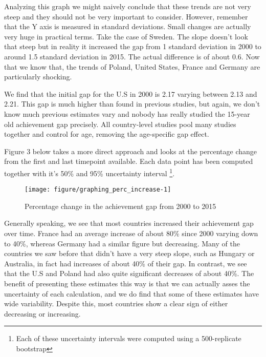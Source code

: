 \documentclass[11pt, a4paper]{article}\usepackage[]{graphicx}\usepackage[]{color}
\begin{document}
Analyzing this graph we might naively conclude that these trends are not very steep and they should not be very important to consider. However, remember that the Y axis is measured in standard deviations. Small changes are actually very huge in practical terms. Take the case of Sweden. The slope doesn't look that steep but in reality it increased the gap from 1 standard deviation in 2000 to around 1.5 standard deviation in 2015. The actual difference is of about 0.6. Now that we know that, the trends of Poland, United States, France and Germany are particularly shocking.


We find that the initial gap for the U.S in 2000 is 2.17 varying between 2.13 and 2.21. This gap is much higher than found in previous studies, but again, we don't know much previous estimates vary and nobody has really studied the 15-year old achievement gap precisely. All country-level studies pool many studies together and control for age, removing the age-specific gap effect.

Figure 3 below takes a more direct approach and looks at the percentage change from the first and last timepoint available. Each data point has been computed together with it's 50\% and 95\% uncertainty interval \footnote{Each of these uncertainty intervals were computed using a 500-replicate bootstrap}.



\begin{figure}
\begin{center}


{\centering \texttt{[image: figure/graphing\_perc\_increase-1]} 

}



\caption{Percentage change in the achievement gap from 2000 to 2015}
\end{center}
\end{figure}

Generally speaking, we see that most countries increased their achievement gap over time. France had an average increase of about 80\% since 2000 varying down to 40\%, whereas Germany had a similar figure but decreasing. Many of the countries we saw before that didn't have a very steep slope, such as Hungary or Australia, in fact had increases of about 40\% of their gap. In contrast, we see that the U.S and Poland had also quite significant decreases of about 40\%. The benefit of presenting these estimates this way is that we can actually asses the uncertainty of each calculation, and we do find that some of these estimates have wide variability. Despite this, most countries show a clear sign of either decreasing or increasing.
\end{document}
